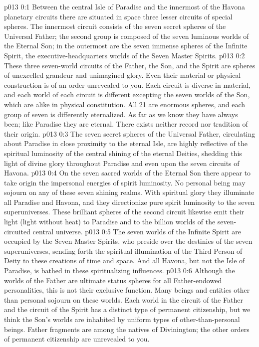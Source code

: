 \author{Perfector of Wisdom}
\vs p013 0:1 Between the central Isle of Paradise and the innermost of the Havona planetary circuits there are situated in space three lesser circuits of special spheres. The innermost circuit consists of the seven secret spheres of the Universal Father; the second group is composed of the seven luminous worlds of the Eternal Son; in the outermost are the seven immense spheres of the Infinite Spirit, the executive\hyp{}headquarters worlds of the Seven Master Spirits.
\vs p013 0:2 These three seven\hyp{}world circuits of the Father, the Son, and the Spirit are spheres of unexcelled grandeur and unimagined glory. Even their material or physical construction is of an order unrevealed to you. Each circuit is diverse in material, and each world of each circuit is different excepting the seven worlds of the Son, which are alike in physical constitution. All 21 are enormous spheres, and each group of seven is differently eternalized. As far as we know they have always been; like Paradise they are eternal. There exists neither record nor tradition of their origin.
\vs p013 0:3 \pc The seven secret spheres of the Universal Father, circulating about Paradise in close proximity to the eternal Isle, are highly reflective of the spiritual luminosity of the central shining of the eternal Deities, shedding this light of divine glory throughout Paradise and even upon the seven circuits of Havona.
\vs p013 0:4 \pc On the seven sacred worlds of the Eternal Son there appear to take origin the impersonal energies of spirit luminosity. No personal being may sojourn on any of these seven shining realms. With spiritual glory they illuminate all Paradise and Havona, and they directionize pure spirit luminosity to the seven superuniverses. These brilliant spheres of the second circuit likewise emit their light (light without heat) to Paradise and to the billion worlds of the seven\hyp{}circuited central universe.
\vs p013 0:5 \pc The seven worlds of the Infinite Spirit are occupied by the Seven Master Spirits, who preside over the destinies of the seven superuniverses, sending forth the spiritual illumination of the Third Person of Deity to these creations of time and space. And all Havona, but not the Isle of Paradise, is bathed in these spiritualizing influences.
\vs p013 0:6 \pc Although the worlds of the Father are ultimate status spheres for all Father\hyp{}endowed personalities, this is not their exclusive function. Many beings and entities other than personal sojourn on these worlds. Each world in the circuit of the Father and the circuit of the Spirit has a distinct type of permanent citizenship, but we think the Son’s worlds are inhabited by uniform types of other\hyp{}than\hyp{}personal beings. Father fragments are among the natives of Divinington; the other orders of permanent citizenship are unrevealed to you.
